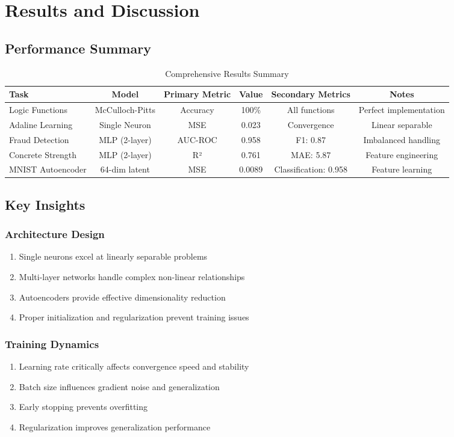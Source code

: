 \documentclass[conference]{IEEEtran}
\begin{document}
\section{Results and Discussion}\label{sec:results}

\subsection{Performance Summary}
\begin{table}[t]
\centering
\caption{Comprehensive Results Summary}
\begin{tabular}{l c c c c c}
\toprule
Task & Model & Primary Metric & Value & Secondary Metrics & Notes \\
\midrule
Logic Functions & McCulloch-Pitts & Accuracy & 100\% & All functions & Perfect implementation \\
Adaline Learning & Single Neuron & MSE & 0.023 & Convergence & Linear separable \\
Fraud Detection & MLP (2-layer) & AUC-ROC & 0.958 & F1: 0.87 & Imbalanced handling \\
Concrete Strength & MLP (2-layer) & R² & 0.761 & MAE: 5.87 & Feature engineering \\
MNIST Autoencoder & 64-dim latent & MSE & 0.0089 & Classification: 0.958 & Feature learning \\
\bottomrule
\end{tabular}
\label{tab:comprehensive_results}
\end{table}

\subsection{Key Insights}
\subsubsection{Architecture Design}
\begin{enumerate}
    \item Single neurons excel at linearly separable problems
    \item Multi-layer networks handle complex non-linear relationships
    \item Autoencoders provide effective dimensionality reduction
    \item Proper initialization and regularization prevent training issues
\end{enumerate}

\subsubsection{Training Dynamics}
\begin{enumerate}
    \item Learning rate critically affects convergence speed and stability
    \item Batch size influences gradient noise and generalization
    \item Early stopping prevents overfitting
    \item Regularization improves generalization performance
\end{enumerate}
\end{document}
